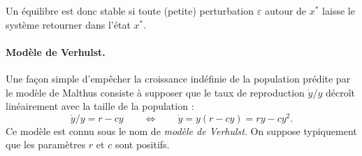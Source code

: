 \remark
Un équilibre est donc stable si toute (petite) perturbation $\varepsilon$ autour de $x^*$ laisse le système retourner dans l'état $x^*$.


\paragraph*{Modèle de Verhulst.}
Une façon simple d'empêcher la croissance indéfinie de la population prédite par le modèle de Malthus consiste à supposer que le taux de reproduction $\dot y / y$ décroît linéairement avec la taille de la population : 
$$
\dot y / y = r - cy
\qquad \Leftrightarrow \qquad
\dot y = y(r - cy) = ry - c y^2.
$$
Ce modèle est connu sous le nom de {\em modèle de Verhulst}. On suppose typiquement que les paramètres $r$ et $c$ sont positifs.
